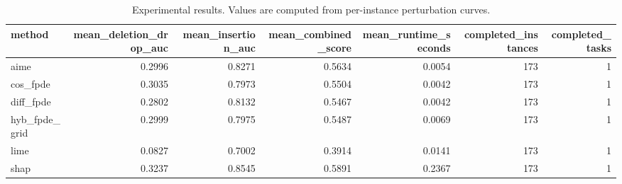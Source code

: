\begin{table}[t]
\caption{Experimental results. Values are computed from per-instance perturbation curves.}
\label{tab:main_results_computed}
\centering
\begin{tabular}{lrrrrrr}
\toprule
method & mean\_deletion\_drop\_auc & mean\_insertion\_auc & mean\_combined\_score & mean\_runtime\_seconds & completed\_instances & completed\_tasks \\
\midrule
aime & 0.2996 & 0.8271 & 0.5634 & 0.0054 & 173 & 1 \\
cos\_fpde & 0.3035 & 0.7973 & 0.5504 & 0.0042 & 173 & 1 \\
diff\_fpde & 0.2802 & 0.8132 & 0.5467 & 0.0042 & 173 & 1 \\
hyb\_fpde\_grid & 0.2999 & 0.7975 & 0.5487 & 0.0069 & 173 & 1 \\
lime & 0.0827 & 0.7002 & 0.3914 & 0.0141 & 173 & 1 \\
shap & 0.3237 & 0.8545 & 0.5891 & 0.2367 & 173 & 1 \\
\bottomrule
\end{tabular}

\end{table}
